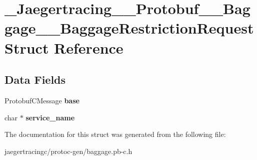 \hypertarget{struct__Jaegertracing____Protobuf____Baggage____BaggageRestrictionRequest}{}\section{\+\_\+\+Jaegertracing\+\_\+\+\_\+\+Protobuf\+\_\+\+\_\+\+Baggage\+\_\+\+\_\+\+Baggage\+Restriction\+Request Struct Reference}
\label{struct__Jaegertracing____Protobuf____Baggage____BaggageRestrictionRequest}
\subsection*{Data Fields}
\begin{DoxyCompactItemize}
\item 
\mbox{\label{struct__Jaegertracing____Protobuf____Baggage____BaggageRestrictionRequest_ad3a35b929715505a5337889c3b66615a}} 
Protobuf\+C\+Message {\bfseries base}
\item 
\mbox{\label{struct__Jaegertracing____Protobuf____Baggage____BaggageRestrictionRequest_af756044d9700136628bb7bd2731d7738}} 
char $\ast$ {\bfseries service\+\_\+name}
\end{DoxyCompactItemize}


The documentation for this struct was generated from the following file\+:\begin{DoxyCompactItemize}
\item 
jaegertracingc/protoc-\/gen/baggage.\+pb-\/c.\+h\end{DoxyCompactItemize}
